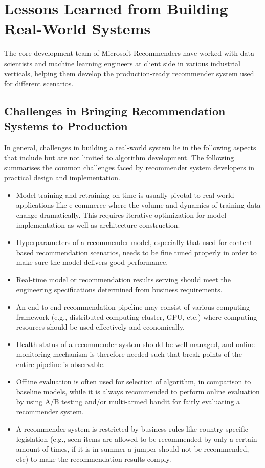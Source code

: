 \section{Lessons Learned from Building Real-World Systems} 

The core development team of Microsoft Recommenders have worked with data scientists and machine learning engineers at client side in various industrial verticals, helping them develop the production-ready recommender system used for different scenarios. 

\subsection{Challenges in Bringing Recommendation Systems to Production}
In general, challenges in building a real-world system lie in the following aspects that include but are not limited to algorithm development. The following summarises the common challenges faced by recommender system developers in practical design and implementation.

\begin{itemize}
    \item Model training and retraining on time is usually pivotal to real-world applications like e-commerce where the volume and dynamics of training data change dramatically. This requires iterative optimization for model implementation as well as architecture construction.
    \item Hyperparameters of a recommender model, especially that used for content-based recommendation scenarios, needs to be fine tuned properly in order to make sure the model delivers good performance. 
    \item Real-time model or recommendation results serving should meet the engineering specifications determined from business requirements. 
    \item An end-to-end recommendation pipeline may consist of various computing framework (e.g., distributed computing cluster, GPU, etc.) where computing resources should be used effectively and economically. 
    \item Health status of a recommender system should be well managed, and online monitoring mechanism is therefore needed such that break points of the entire pipeline is observable.
    \item Offline evaluation is often used for selection of algorithm, in comparison to baseline models, while it is always recommended to perform online evaluation by using A/B testing and/or multi-armed bandit for fairly evaluating a recommender system.
    \item A recommender system is restricted by business rules like country-specific legislation (e.g., seen items are allowed to be recommended by only a certain amount of times, if it is in summer a jumper should not be recommended, etc) to make the recommendation results comply.
\end{itemize}

